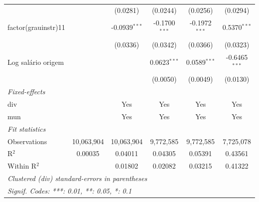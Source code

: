 \begin{tabular}{lccccc}
                            &                & (0.0281)               & (0.0244)                & (0.0256)                & (0.0294)\\   
   factor(grauinstr)11      &                & -0.0939$^{***}$        & -0.1700$^{***}$         & -0.1972$^{***}$         & 0.5370$^{***}$\\   
                            &                & (0.0336)               & (0.0342)                & (0.0366)                & (0.0323)\\   
   Log salário origem       &                &                        & 0.0623$^{***}$          & 0.0589$^{***}$          & -0.6465$^{***}$\\   
                            &                &                        & (0.0050)                & (0.0049)                & (0.0130)\\   
   \midrule
   \emph{Fixed-effects}\\
   div                      &                & Yes                    & Yes                     & Yes                     & Yes\\  
   mun                      &                & Yes                    & Yes                     & Yes                     & Yes\\  
   \midrule
   \emph{Fit statistics}\\
   Observations             & 10,063,904     & 10,063,904             & 9,772,585               & 9,772,585               & 7,725,078\\  
   R$^2$                    & 0.00035        & 0.04011                & 0.04305                 & 0.05391                 & 0.43561\\  
   Within R$^2$             &                & 0.01802                & 0.02082                 & 0.03215                 & 0.41322\\  
   \midrule \midrule
   \multicolumn{6}{l}{\emph{Clustered (div) standard-errors in parentheses}}\\
   \multicolumn{6}{l}{\emph{Signif. Codes: ***: 0.01, **: 0.05, *: 0.1}}\\
\end{tabular}
\par\endgroup


